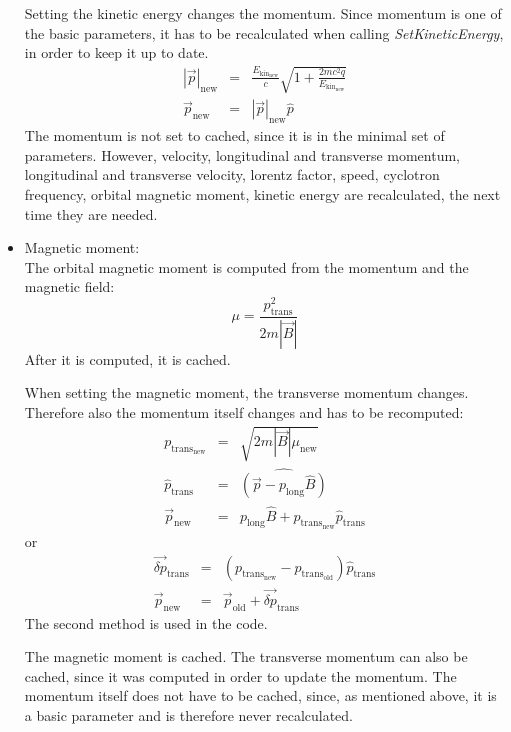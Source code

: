 \begin{itemize}
		Setting the kinetic energy changes the momentum. Since momentum is one of the basic parameters, it has to be recalculated when calling \textit{SetKineticEnergy}, in order to keep it up to date.
		\begin{eqnarray}
			|\vec{p}|_{\mathrm{new}} &=& \frac{E_{\mathrm{kin}_{\mathrm{new}}}}{c} \sqrt{1+\frac{2 m c^2 q}{E_{\mathrm{kin}_{\mathrm{new}}}}}\\
			\vec{p}_{\mathrm{new}} &=& | \vec{p} |_{\mathrm{new}} \hat{p}
		\end{eqnarray}
		The momentum is not set to cached, since it is in the minimal set of parameters.
		However, velocity, longitudinal and transverse momentum, longitudinal and transverse velocity, lorentz factor, speed, cyclotron frequency, orbital magnetic moment, kinetic energy are recalculated, the next time they are needed. 

		\item Magnetic moment:\\
		The orbital magnetic moment is computed from the momentum and the magnetic field:
		\begin{equation}
			\mu = \frac{ p_{\mathrm{trans}}^2}{2 m |\vec{B}|} 
		\end{equation}
		After it is computed, it is cached.

		When setting the magnetic moment, the transverse momentum changes. Therefore also the momentum itself changes and has to be recomputed:
		\begin{eqnarray}
			p_{\mathrm{trans}_{\mathrm{new}}} &=& \sqrt{2 m |\vec{B}| \mu_{\mathrm{new}}}\\
			\hat{p}_{\mathrm{trans}} &=& \widehat{\left(\vec{p} - p_{\mathrm{long}} \hat{B}\right)} \\
			\vec{p}_{\mathrm{new}} &=& p_{\mathrm{long}} \hat{B} +  p_{\mathrm{trans}_{\mathrm{new}}} \hat{p}_{\mathrm{trans}}
		\end{eqnarray} or
		\begin{eqnarray}
			\vec{\delta p}_{\mathrm{trans}} &=& \left(p_{\mathrm{trans}_{\mathrm{new}}} - p_{\mathrm{trans}_{\mathrm{old}}}\right) \hat{p}_{\mathrm{trans}} \\
			\vec{p}_{\mathrm{new}} &=& \vec{p}_{\mathrm{old}}  +  \vec{\delta p}_{\mathrm{trans}}
		\end{eqnarray} 
		The second method is used in the code.
		
		The magnetic moment is cached. The transverse momentum can also be cached, since it was computed in order to update the momentum. The momentum itself does not have to be cached, since, as mentioned above, it is a basic parameter and is therefore never recalculated.
		

\end{itemize}
